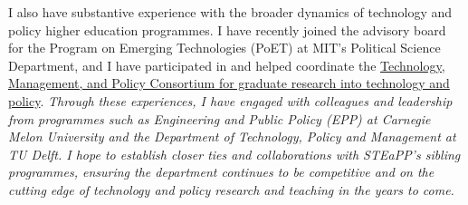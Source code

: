\documentclass[11pt]{letter}
\begin{document}
\begin{letter}
I also have substantive experience with the broader dynamics of technology and policy higher education programmes.
%
I have recently joined the advisory board for the Program on Emerging Technologies (PoET) at MIT's Political Science Department, and I have participated in and helped coordinate the \href{https://www.tudelft.nl/en/tpm/about-the-faculty/organisation-chart-facts-figures/mission}{Technology, Management, and Policy Consortium for graduate research into technology and policy}.  
%
\emph{Through these experiences, I have engaged with colleagues and leadership from programmes such as Engineering and Public Policy (EPP) at Carnegie Melon University and the Department of Technology, Policy and Management at TU Delft.
%
I hope to establish closer ties and collaborations with STEaPP's sibling programmes, ensuring the department continues to be competitive and on the cutting edge of technology and policy research and teaching in the years to come.}





\end{letter}
\end{document}
